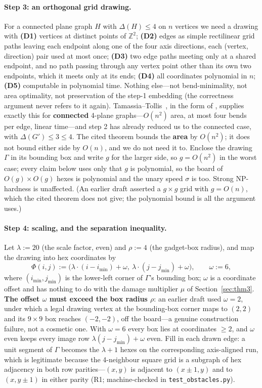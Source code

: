 \documentclass[11pt,a4paper]{article}
\theoremstyle{plain}
\theoremstyle{definition}
\theoremstyle{plain}
\theoremstyle{definition}
\theoremstyle{remark}
\newcommand{\src}[1]{\texttt{#1}}
\begin{document}
\paragraph{Step 3: an orthogonal grid drawing.} For a connected plane graph $H$ with
$\Delta(H)\le 4$ on $n$ vertices we need a drawing with \textbf{(D1)} vertices at distinct points
of $\mathbb{Z}^2$; \textbf{(D2)} edges as simple rectilinear grid paths leaving each endpoint
along one of the four axis directions, each (vertex, direction) pair used at most once;
\textbf{(D3)} two edge paths meeting only at a shared endpoint, and no path passing through any
vertex point other than its own two endpoints, which it meets only at its ends; \textbf{(D4)}
all coordinates polynomial in $n$; \textbf{(D5)} computable in polynomial time. Nothing
else---not bend-minimality, not area optimality, not preservation of the step-1 embedding (the
correctness argument never refers to it again). Tamassia--Tollis~\cite{TT89}, in the form of
\cite[Thm.~7.3]{DG13}, supplies exactly this for \textbf{connected} 4-plane graphs---$O(n^2)$
area, at most four bends per edge, linear time---and step 2 has already reduced us to the
connected case, with $\Delta(G')\le 3\le 4$. The cited theorem bounds the \textbf{area} by
$O(n^2)$; it does not bound either side by $O(n)$, and we do not need it to. Enclose the drawing
$\Gamma$ in its bounding box and write $g$ for the larger side, so $g=O(n^2)$ in the worst case;
every claim below uses only that $g$ is polynomial, so the board of $O(g)\times O(g)$ hexes is
polynomial and the unary speed $\sigma$ is too. Strong NP-hardness is unaffected. (An earlier
draft asserted a $g\times g$ grid with $g=O(n)$, which the cited theorem does not give; the
polynomial bound is all the argument uses.)

\paragraph{Step 4: scaling, and the separation inequality.} Let $\lambda:=20$ (the scale factor,
even) and $\rho:=4$ (the gadget-box radius), and map the drawing into hex coordinates by
\[
  \Phi(i,j):=\bigl(\lambda\cdot(i-i_{\min})+\omega,\ \lambda\cdot(j-j_{\min})+\omega\bigr),
  \qquad \omega:=6,
\]
where $(i_{\min},j_{\min})$ is the lower-left corner of $\Gamma$'s bounding box; $\omega$ is a
coordinate offset and has nothing to do with the damage multiplier $\mu$ of
Section~\ref{sec:thm3}. \textbf{The offset $\omega$ must exceed the box radius $\rho$}: an
earlier draft used $\omega=2$, under which a legal drawing vertex at the bounding-box corner maps
to $(2,2)$ and its $9\times 9$ box reaches $(-2,-2)$, off the board---a genuine construction
failure, not a cosmetic one. With $\omega=6$ every box lies at coordinates $\ge 2$, and $\omega$
even keeps every image row $\lambda(j-j_{\min})+\omega$ even. Fill in each drawn edge: a unit segment of $\Gamma$ becomes the $\lambda+1$ hexes on the
corresponding axis-aligned run, which is legitimate because the 4-neighbour square grid is a
subgraph of hex adjacency in both row parities---$(x,y)$ is adjacent to $(x\pm 1,y)$ and to
$(x,y\pm 1)$ in either parity (R1; machine-checked in \src{test\_obstacles.py}).
\end{document}

